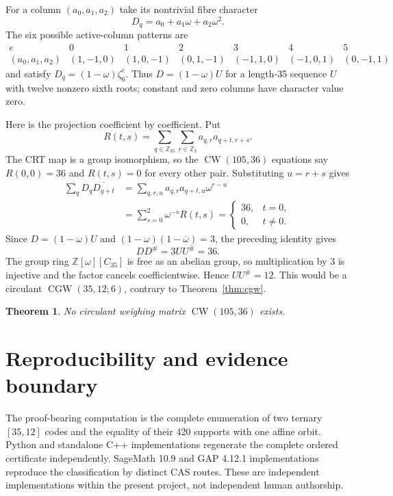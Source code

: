 \documentclass[10pt]{article}
\newtheorem{theorem}{Theorem}
\newcommand{\Z}{\mathbb Z}
\newcommand{\CW}{\operatorname{CW}}
\newcommand{\CGW}{\operatorname{CGW}}
\begin{document}
For a column $(a_0,a_1,a_2)$ take its nontrivial fibre character
\[
 D_q=a_0+a_1\omega+a_2\omega^2.
\]
The six possible active-column patterns are
\[
\begin{array}{c|cccccc}
e&0&1&2&3&4&5\\ \hline
(a_0,a_1,a_2)&(1,-1,0)&(1,0,-1)&(0,1,-1)&
(-1,1,0)&(-1,0,1)&(0,-1,1)
\end{array}
\]
and satisfy $D_q=(1-\omega)\zeta_6^e$.  Thus
$D=(1-\omega)U$ for a length-35 sequence $U$ with twelve nonzero sixth
roots; constant and zero columns have character value zero.

Here is the projection coefficient by coefficient.  Put
\[
 R(t,s)=\sum_{q\in\Z_{35}}\sum_{r\in\Z_3}
 a_{q,r}a_{q+t,r+s}.
\]
The CRT map is a group isomorphism, so the $\CW(105,36)$ equations say
$R(0,0)=36$ and $R(t,s)=0$ for every other pair.  Substituting
$u=r+s$ gives
\[
\begin{aligned}
 \sum_qD_q\overline{D_{q+t}}
 &=\sum_{q,r,u}a_{q,r}a_{q+t,u}\omega^{r-u}\\
 &=\sum_{s=0}^2\omega^{-s}R(t,s)
 =\begin{cases}36,&t=0,\\0,&t\ne0.\end{cases}
\end{aligned}
\]
Since $D=(1-\omega)U$ and
$(1-\omega)(1-\overline{\omega})=3$, the preceding identity gives
\[
 DD^\#=3UU^\#=36.
\]
The group ring $\mathbb Z[\omega][C_{35}]$ is free as an abelian group,
so multiplication by $3$ is injective and the factor cancels
coefficientwise.  Hence $UU^\#=12$.
This would be a circulant $\CGW(35,12;6)$, contrary to
Theorem~\ref{thm:cgw}.

\begin{theorem}
No circulant weighing matrix $\CW(105,36)$ exists.
\end{theorem}

\section{Reproducibility and evidence boundary}

The proof-bearing computation is the complete enumeration of two ternary
$[35,12]$ codes and the equality of their 420 supports with one affine orbit.
Python and standalone C++ implementations regenerate the complete ordered
certificate independently.  SageMath 10.9 and GAP 4.12.1 implementations
reproduce the classification by distinct CAS routes.  These are independent
implementations within the present project, not independent human
authorship.
\end{document}
